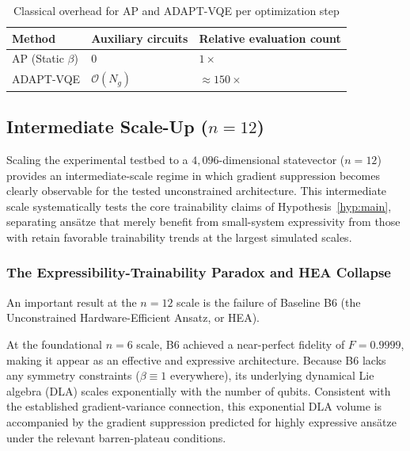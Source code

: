 \documentclass[10pt,twocolumn]{article}
\theoremstyle{remark}
\begin{document}
\begin{table}[!h]
\centering
\caption{Classical overhead for AP and ADAPT-VQE per optimization step}
\label{tab:adapt_overhead}
\footnotesize
\setlength{\tabcolsep}{2pt}
\renewcommand{\arraystretch}{1.12}
\begin{tabularx}{\columnwidth}{@{}>{\raggedright\arraybackslash}p{}
    >{\centering\arraybackslash}p{}
    >{\centering\arraybackslash}X@{}}
\toprule
\textbf{Method} & \textbf{Auxiliary circuits} & \textbf{Relative evaluation count} \\
\midrule
AP (Static $\beta$) & $0$ & $1\times$ \\
\mbox{ADAPT-VQE} & $\mathcal{O}(N_g)$ & $\approx 150\times$ \\
\bottomrule
\end{tabularx}
\end{table}



\subsection{Intermediate Scale-Up ($n=12$)}

Scaling the experimental testbed to a $4,096$-dimensional statevector ($n=12$) provides an intermediate-scale regime in which gradient suppression becomes clearly observable for the tested unconstrained architecture. This intermediate scale systematically tests the core trainability claims of Hypothesis~\ref{hyp:main}, separating ans\"atze that merely benefit from small-system expressivity from those with retain favorable trainability trends at the largest simulated scales.

\subsubsection{The Expressibility-Trainability Paradox and HEA Collapse}
An important result at the $n=12$ scale is the failure of Baseline B6 (the Unconstrained Hardware-Efficient Ansatz, or HEA).

At the foundational $n=6$ scale, B6 achieved a near-perfect fidelity of $F=0.9999$, making it appear as an effective and expressive architecture. Because B6 lacks any symmetry constraints ($\beta \equiv 1$ everywhere), its underlying dynamical Lie algebra (DLA) scales exponentially with the number of qubits. Consistent with the established gradient-variance connection, this exponential DLA volume is accompanied by the gradient suppression predicted for highly expressive ansätze under the relevant barren-plateau conditions.
\end{document}
